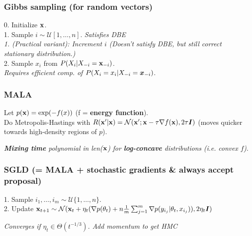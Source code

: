 \subsubsection{Gibbs sampling (for random vectors)}
0. Initialize ${\mathbf{x}}$.\\
1. Sample $i\sim\mathcal{U}[1,\ldots,n]$.\emph{ Satisfies DBE}\\
\emph{1. (Practical variant): Increment $i$ (Doesn't satisfy DBE, but still correct stationary distribution.)}\\
2. Sample $x_i$ from $P(X_i|X_{-i}={\mathbf{x}}_{-i})$.{\tiny\CircArrowRight{}}\\
\emph{Requires efficient comp. of $P(X_i=x_i|X_{-i}={\bm{x}}_{-i})$}.

\subsubsection{MALA}
Let $p({\mathbf{x}}) = \exp(-f(x))$ (f = \textbf{energy function}).\\
Do Metropolis-Hastings with $R({\mathbf{x}}'|{\mathbf{x}}) = \mathcal{N}({\mathbf{x}}';{\mathbf{x}}-\tau\nabla f({\mathbf{x}}), 2\tau{\bm{I}})$ (moves quicker towards high-density regions of $p$).

\emph{\textbf{Mixing time} polynomial in len(${\mathbf{x}}$) for \textbf{log-concave} distributions (i.e. convex $f$)}.

\subsubsection{SGLD (= MALA + stochastic gradients \& always accept proposal)}
1. Sample $i_1,\ldots,i_m \sim \mathcal{U}\{1,\ldots,n\}$.\\
2. Update ${\mathbf{x}}_{t+1} \sim \mathcal{N}({\mathbf{x}}_t + \eta_t(\nabla p(\theta_t)+n\frac{1}{m}\sum_{j=1}^m\nabla p(y_{i_j}|\theta_t,x_{i_j})), 2\eta_t{\bm{I}})$

\emph{Converges if $\eta_t \in \Theta(t^{-1/3})$. Add momentum to get HMC}